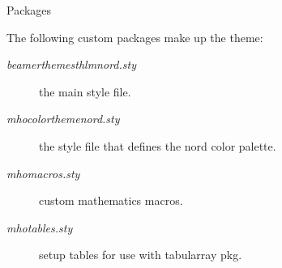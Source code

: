 \documentclass[\string~/GitHub/sthlmNordBeamerTheme/sthlmNordLightDemo.tex]{subfiles}
\begin{document}
\begin{frame}[t,fragile]{Packages}

	The following custom packages make up the \snord theme:
	\begin{description}
		\item[\textit{beamerthemesthlmnord.sty}] the main style file.
		\item[\textit{mhocolorthemenord.sty}] the style file that defines the nord color palette.
		\item[\textit{mhomacros.sty}] custom mathematics macros.
		\item[\textit{mhotables.sty}] setup tables for use with tabularray pkg.
	\end{description}

\end{frame}
\end{document}
